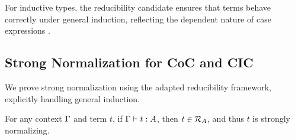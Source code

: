 \documentclass{article}
\begin{document}
For inductive types, the reducibility candidate ensures that terms
behave correctly under general induction, reflecting the dependent
nature of case expressions \cite{werner1994}.

\newpage

\subsection{Strong Normalization for CoC and CIC}
We prove strong normalization using the adapted reducibility framework,
explicitly handling general induction.

\begin{theorem}
For any context \(\Gamma\) and term \(t\), if \(\Gamma \vdash t : A\),
then \(t \in \mathcal{R}_A\), and thus \(t\) is strongly normalizing.
\end{theorem}
\end{document}
